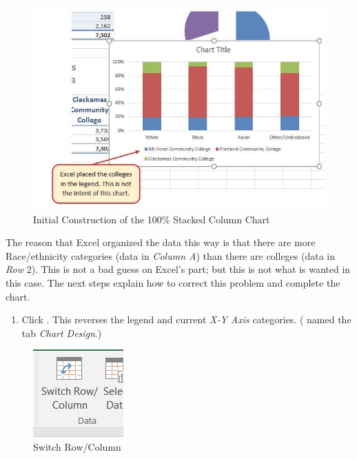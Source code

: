 \begin{figure}[H]
	\centering
	\includegraphics[width=\maxwidth{.95\linewidth}]{gfx/ch04_fig25}
	\caption{Initial Construction of the 100\% Stacked Column Chart}
	\label{04:fig25}
\end{figure}

The reason that Excel organized the data this way is that there are more Race/ethnicity categories (data in \textit{Column A}) than there are colleges (data in \textit{Row }$ 2 $). This is not a bad guess on Excel's part; but this is not what is wanted in this case. The next steps explain how to correct this problem and complete the chart.

\begin{enumerate}
	\item Click . This reverses the legend and current \textit{X-Y Axis} categories. ( named the tab \textit{Chart Design}.)
\end{enumerate}

\begin{figure}[H]
	\centering
	\includegraphics[width=\maxwidth{.95\linewidth}]{gfx/ch04_fig26}
	\caption{Switch Row/Column}
	\label{04:fig26}
\end{figure}

